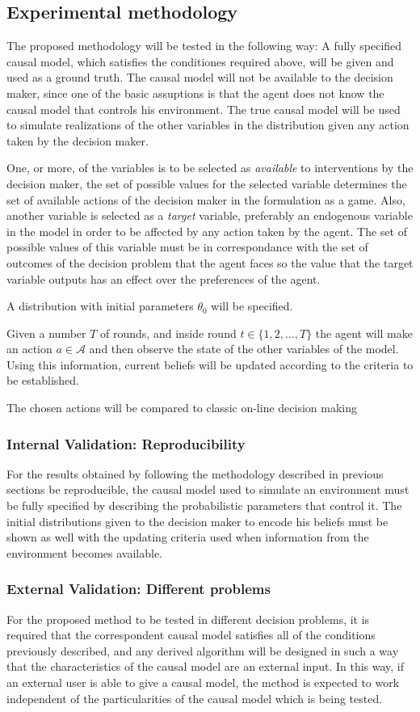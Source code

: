 \documentclass[english,letterpaper,12pt,final]{article}
\theoremstyle{definition}
\begin{document}
\subsection{Experimental methodology}
The proposed methodology will be tested in the following way: A fully specified causal model, which satisfies the conditiones required above, will be given and used as a ground truth. The causal model will not be available to the decision maker, since one of the basic assuptions is that the agent does not know the causal model that controls his environment. The true causal model will be used to simulate realizations of the other variables in the distribution given any action taken by the decision maker.

One, or more, of the variables is to be selected as \textit{available} to interventions by the decision maker, the set of possible values for the selected variable determines the set of available actions of the decision maker in the formulation as a game. Also, another variable is selected as a \textit{target} variable, preferably an endogenous variable in the model in order to be affected by any action taken by the agent. The set of possible values of this variable must be in correspondance with the set of outcomes of the decision problem that the agent faces so the value that the target variable outputs has an effect over the preferences of the agent. 

A distribution with initial parameters $\theta_0$ will be specified. 

Given a number $T$ of rounds, and inside round $t \in \{1,2,...,T \}$ the agent will make an action $a \in \mathcal{A}$ and then observe the state of the other variables of the model. Using this information, current beliefs will be updated according to the criteria to be established.  

The chosen actions will be compared to classic on-line decision making 
\subsubsection{Internal Validation: Reproducibility}
For the results obtained by following the methodology described in previous sections be reproducible, the causal model used to simulate an environment must be fully specified by describing the probabilistic parameters that control it. The initial distributions given to the decision maker to encode his beliefs must be shown as well with the updating criteria used when information from the environment becomes available. 
\subsubsection{External Validation: Different problems}
For the proposed method to be tested in different decision problems, it is required that the correspondent causal model satisfies all of the conditions previously described, and any derived algorithm will be designed in such a way that the characteristics of the causal model are an external input. In this way, if an external user is able to give a causal model, the method is expected to work independent of the particularities of the causal model which is being tested.
\end{document}
